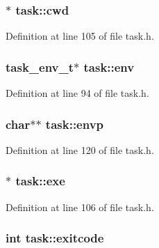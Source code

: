 \hypertarget{structtask_a7099e7ba6a4c94559edfb4d396803b15}{
\subsubsection[{cwd}]{$\ast$ task\+::cwd}}\label{structtask_a7099e7ba6a4c94559edfb4d396803b15}


Definition at line 105 of file task.\+h.

\hypertarget{structtask_a8dbbb79f7c29771d36f1d98ec84cbbdf}{
\subsubsection[{env}]{\setlength{\rightskip}{0pt plus 5cm}task\+\_\+env\+\_\+t$\ast$ task\+::env}}\label{structtask_a8dbbb79f7c29771d36f1d98ec84cbbdf}


Definition at line 94 of file task.\+h.

\hypertarget{structtask_a09fbc78d666a0b49e2e2064121d28364}{
\subsubsection[{envp}]{\setlength{\rightskip}{0pt plus 5cm}char$\ast$$\ast$ task\+::envp}}\label{structtask_a09fbc78d666a0b49e2e2064121d28364}


Definition at line 120 of file task.\+h.

\hypertarget{structtask_a22a59fcfc18d5f671340669f96571768}{
\subsubsection[{exe}]{$\ast$ task\+::exe}}\label{structtask_a22a59fcfc18d5f671340669f96571768}


Definition at line 106 of file task.\+h.

\hypertarget{structtask_a9bd7bbd83fe1f4744c76ff240b6da5db}{
\subsubsection[{exitcode}]{\setlength{\rightskip}{0pt plus 5cm}int task\+::exitcode}}\label{structtask_a9bd7bbd83fe1f4744c76ff240b6da5db}


